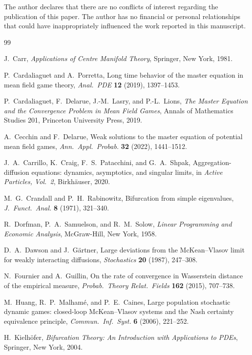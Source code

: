 \documentclass[11pt]{amsart}
\theoremstyle{definition}
\theoremstyle{remark}
\begin{document}
The author declares that there are no conflicts of interest regarding the publication of this paper. The author has no financial or personal relationships that could have inappropriately influenced the work reported in this manuscript.
\begin{thebibliography}{99}

J.~Carr,
\emph{Applications of Centre Manifold Theory},
Springer, New York, 1981.

P.~Cardaliaguet and A.~Porretta,
Long time behavior of the master equation in mean field game theory,
\emph{Anal.\ PDE} \textbf{12} (2019), 1397--1453.

P.~Cardaliaguet, F.~Delarue, J.-M.~Lasry, and P.-L.~Lions,
\emph{The Master Equation and the Convergence Problem in Mean Field Games},
Annals of Mathematics Studies 201, Princeton University Press, 2019.

A.~Cecchin and F.~Delarue,
Weak solutions to the master equation of potential mean field games,
\emph{Ann.\ Appl.\ Probab.} \textbf{32} (2022), 1441--1512.

J.~A.~Carrillo, K.~Craig, F.~S.~Patacchini, and G.~A.~Shpak,
Aggregation-diffusion equations: dynamics, asymptotics, and singular limits,
in \emph{Active Particles, Vol.~2}, Birkh\"auser, 2020.

M.~G.~Crandall and P.~H.~Rabinowitz,
Bifurcation from simple eigenvalues,
\emph{J.\ Funct.\ Anal.} \textbf{8} (1971), 321--340.

R.~Dorfman, P.~A.~Samuelson, and R.~M.~Solow,
\emph{Linear Programming and Economic Analysis},
McGraw-Hill, New York, 1958.

D.~A.~Dawson and J.~G\"artner,
Large deviations from the McKean--Vlasov limit for weakly interacting diffusions,
\emph{Stochastics} \textbf{20} (1987), 247--308.

N.~Fournier and A.~Guillin,
On the rate of convergence in Wasserstein distance of the empirical measure,
\emph{Probab.\ Theory Relat.\ Fields} \textbf{162} (2015), 707--738.

M.~Huang, R.~P.~Malham\'e, and P.~E.~Caines,
Large population stochastic dynamic games: closed-loop McKean--Vlasov systems and the Nash certainty equivalence principle,
\emph{Commun.\ Inf.\ Syst.} \textbf{6} (2006), 221--252.

H.~Kielh\"ofer,
\emph{Bifurcation Theory: An Introduction with Applications to PDEs},
Springer, New York, 2004.


\end{thebibliography}
\end{document}
